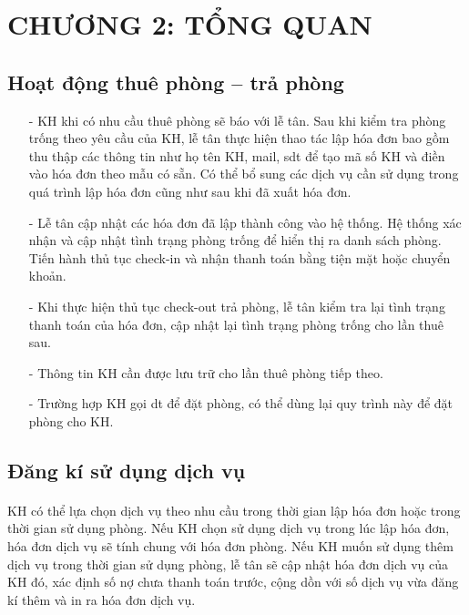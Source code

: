 
\fontsize{16}{20}\selectfont
\section*{CHƯƠNG 2: TỔNG QUAN}
\fontsize{14}{20}\selectfont
\setcounter{section}{2}
\subsection{Hoạt động thuê phòng – trả phòng}
\fontsize{13}{13}\selectfont
\begin{itemize}

    \item[-] KH khi có nhu cầu thuê phòng sẽ báo với lễ tân. Sau khi kiểm tra phòng trống theo yêu cầu của KH, lễ tân thực hiện thao tác lập hóa đơn bao gồm thu thập các thông tin như họ tên KH, mail, sdt để tạo mã số KH và điền vào hóa đơn theo mẫu có sẵn. Có thể bổ sung các dịch vụ cần sử dụng trong quá trình lập hóa đơn cũng như sau khi đã xuất hóa đơn. 
    \item[-] Lễ tân cập nhật các hóa đơn đã lập thành công vào hệ thống. Hệ thống xác nhận và cập nhật tình trạng phòng trống để hiển thị ra danh sách phòng. Tiến hành thủ tục check-in và nhận thanh toán bằng tiện mặt hoặc chuyển khoản.
    \item[-]Khi thực hiện thủ tục check-out trả phòng, lễ tân kiểm tra lại tình trạng thanh toán của hóa đơn, cập nhật lại tình trạng phòng trống cho lần thuê sau.
    \item[-]Thông tin KH cần được lưu trữ cho lần thuê phòng tiếp theo.
    \item[-]Trường hợp KH gọi dt để đặt phòng, có thể dùng lại quy trình này để đặt phòng cho KH.
    
\end{itemize}

\fontsize{14}{20}\selectfont
\subsection{Đăng kí sử dụng dịch vụ}
\fontsize{13}{20}\selectfont
\paragraph{}
KH có thể lựa chọn dịch vụ theo nhu cầu trong thời gian lập hóa đơn hoặc trong thời gian sử dụng phòng. Nếu KH chọn sử dụng dịch vụ trong lúc lập hóa đơn, hóa đơn dịch vụ sẽ tính chung với hóa đơn phòng. Nếu KH muốn sử dụng thêm dịch vụ trong thời gian sử dụng phòng, lễ tân sẽ cập nhật hóa đơn dịch vụ của KH đó, xác định số nợ chưa thanh toán trước, cộng dồn với số dịch vụ vừa đăng kí thêm và in ra hóa đơn dịch vụ.


